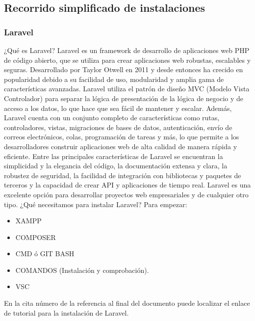 \documentclass{article}
\begin{document}
\subsection{Recorrido simplificado de instalaciones}
\subsubsection{Laravel}
¿Qué es Laravel? Laravel es un framework de desarrollo de aplicaciones web PHP de código abierto, que se utiliza para crear aplicaciones web robustas, escalables y seguras. 
Desarrollado por Taylor Otwell en 2011 y desde entonces ha crecido en popularidad debido a su facilidad de uso, modularidad y amplia gama de características avanzadas.
Laravel utiliza el patrón de diseño MVC (Modelo Vista Controlador) para separar la lógica de presentación de la lógica de negocio y de acceso a los datos, lo que hace que sea fácil de mantener y escalar. Además, Laravel cuenta con un conjunto completo de características como rutas, controladores, vistas, migraciones de bases de datos, autenticación, envío de correos electrónicos, colas, programación de tareas y más, lo que permite a los desarrolladores construir aplicaciones web de alta calidad de manera rápida y eficiente.
Entre las principales características de Laravel se encuentran la simplicidad y la elegancia del código, la documentación extensa y clara, la robustez de seguridad, la facilidad de integración con bibliotecas y paquetes de terceros y la capacidad de crear API y aplicaciones de tiempo real. Laravel es una excelente opción para desarrollar proyectos web empresariales y de cualquier otro tipo.
¿Qué necesitamos para instalar Laravel?
Para empezar:
\begin{itemize}
    \item XAMPP
    \item COMPOSER
    \item CMD ó GIT BASH
    \item COMANDOS (Instalación y comprobación).
    \item VSC
\end{itemize}
En la cita número \cite{instalacionLaravel} de la referencia al final del documento puede localizar el enlace de tutorial para la instalación de Laravel.
\end{document}
